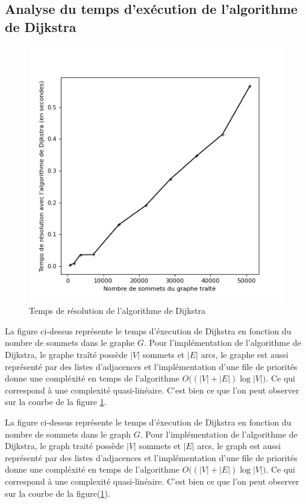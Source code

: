 \documentclass{article}
\begin{document}
\subsection{Analyse du temps d'exécution de l'algorithme de Dijkstra}

\begin{figure}[h!]
    \centering
    \includegraphics[scale=0.47]{dij_solving_time.png}{}
    \caption{Temps de résolution de l'algorithme de Dijkstra}
    \label{dj-time}
\end{figure}

La figure ci-dessus représente le temps d'éxecution de Dijkstra en fonction du
nombre de sommets dans le graphe $G$. Pour l'implémentation de l'algorithme de
Dijkstra, le graphe traîté possède $|V|$ sommets et $|E|$ arcs, le graphe est
aussi représenté par des listes d'adjacences et l'implémentation d'une file de
priorités donne une compléxité en temps de l'algorithme
$O\big((|V|+|E|)\log|V|\big)$. Ce qui correspond à une complexité
quasi-linéaire. C'est bien ce que l'on peut observer sur la courbe de la
figure \ref{dj-time}.

La figure ci-dessus représente le temps d'éxecution de Dijkstra en fonction du
nombre de sommets dans le graph $G$. Pour l'implémentation de l'algorithme de
Dijkstra, le graph traité possède $|V|$ sommets et $|E|$ arcs, le graph est
aussi représenté par des listes d'adjacences et l'implémentation d'une file de
priorités donne une compléxité en temps de l'algorithme
$O\big((|V|+|E|)\log|V|\big)$. Ce qui correspond à une complexité
quasi-linéaire. C'est bien ce que l'on peut observer sur la courbe de la
figure(\ref{dj-time}).
\end{document}
